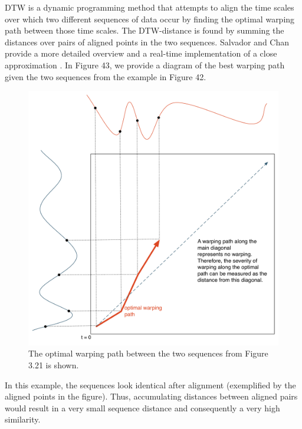 \documentclass[12pt]{report} 	%
\numberwithin{figure}{chapter}
\numberwithin{table}{chapter}
\numberwithin{equation}{chapter}
\begin{document}
\begin{flushleft}
DTW is a dynamic programming method that attempts to align the time scales over which two different sequences of data occur by finding the optimal warping path between those time scales. The DTW-distance is found by summing the distances over pairs of aligned points in the two sequences. Salvador and Chan provide a more detailed overview and a real-time implementation of a close approximation \cite{Salvador:2004et}. In Figure 43, we provide a diagram of the best warping path given the two sequences from the example in Figure 42.
\begin{figure}[h!]
\begin{center}
\includegraphics[scale=0.5]{DTWExample}
\caption[Optimal warping path]{The optimal warping path between the two sequences from Figure 3.21 is shown.}
\end{center}
\end{figure}

In this example, the sequences look identical after alignment (exemplified by the aligned points in the figure). Thus, accumulating distances between aligned pairs would result in a very small sequence distance and consequently a very high similarity.


\end{flushleft}
\end{document}
